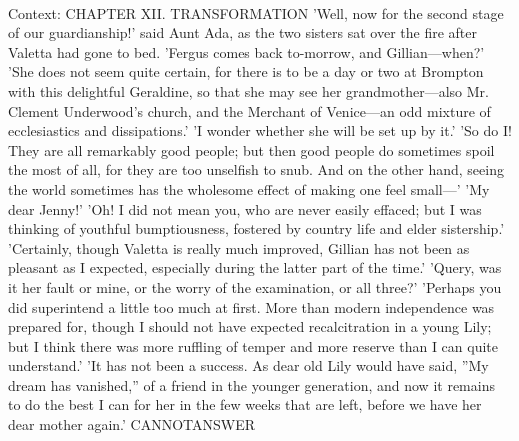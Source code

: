 \documentclass[11pt,a4paper, onecolumn]{article}
\begin{document}
\\ Context: CHAPTER XII. TRANSFORMATION 'Well, now for the second stage of our guardianship!' said Aunt Ada, as the two sisters sat over the fire after Valetta had gone to bed. 'Fergus comes back to-morrow, and Gillian---when?' 'She does not seem quite certain, for there is to be a day or two at Brompton with this delightful Geraldine, so that she may see her grandmother---also Mr. Clement Underwood's church, and the Merchant of Venice---an odd mixture of ecclesiastics and dissipations.' 'I wonder whether she will be set up by it.' 'So do I! They are all remarkably good people; but then good people do sometimes spoil the most of all, for they are too unselfish to snub. And on the other hand, seeing the world sometimes has the wholesome effect of making one feel small---' 'My dear Jenny!' 'Oh! I did not mean you, who are never easily effaced; but I was thinking of youthful bumptiousness, fostered by country life and elder sistership.' 'Certainly, though Valetta is really much improved, Gillian has not been as pleasant as I expected, especially during the latter part of the time.' 'Query, was it her fault or mine, or the worry of the examination, or all three?' 'Perhaps you did superintend a little too much at first. More than modern independence was prepared for, though I should not have expected recalcitration in a young Lily; but I think there was more ruffling of temper and more reserve than I can quite understand.' 'It has not been a success. As dear old Lily would have said, ''My dream has vanished,'' of a friend in the younger generation, and now it remains to do the best I can for her in the few weeks that are left, before we have her dear mother again.' CANNOTANSWER
\end{document}
